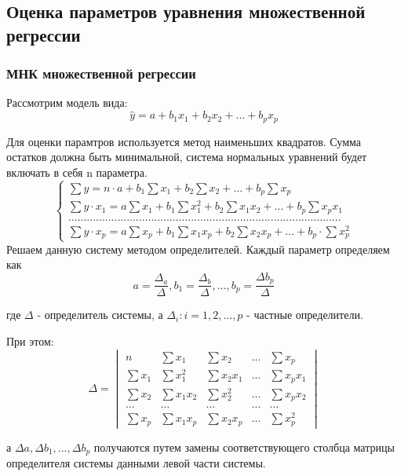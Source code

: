 \documentclass[aps,%
12pt,%
final,%
oneside,
onecolumn,%
musixtex, %
superscriptaddress,%
centertags]{article} %
\theoremstyle{plain}
\theoremstyle{definition}
\theoremstyle{remark}
\begin{document}
\newpage
\subsection{Оценка параметров уравнения множественной регрессии}

\subsubsection{МНК множественной регрессии}

Рассмотрим модель вида:
$$ \widehat{y} = a +b_1x_1 + b_2x_2 + \ldots + b_px_p$$

Для оценки парамтров используется метод наименьших квадратов. Сумма остатков должна быть минимальной, система нормальных уравнений будет включать в себя n параметра. 
$$\left \{
\begin{matrix}
	\sum y = n \cdot a + b_1 \sum x_1 + b_2 \sum x_2 + \ldots + b_p \sum x_p \\[0.3cm]
	\sum y \cdot x_1 = a \sum x_1 + b_1 \sum x_1^2 + b_2 \sum x_1x_2 + \ldots + b_p \sum x_p x_1 \\[0.3cm]
	......................................................................................... \\[0.3cm]
	\sum y \cdot x_p = a\sum x_p + b_1 \sum x_1x_p + b_2 \sum x_2x_p + \ldots + b_p \cdot \sum x_p^2
\end{matrix}
\right.
$$
Решаем данную систему методом определителей. Каждый параметр определяем как
$$ a =\frac{\Delta_a}{\Delta}, b_1 =\frac{\Delta_b}{\Delta}, \ldots , b_p = \frac{\Delta b_p}{\Delta} $$

где $\Delta$ - определитель системы, а $\Delta_i:  i ={1,2,...,p}$ - частные определители.

При этом:
$$\Delta = 
\begin{vmatrix}
n & \sum x_1 & \sum x_2 & \ldots & \sum x_p \\[0.3cm]
\sum x_1 & \sum x_1^2 & \sum x_2x_1 & \ldots & \sum x_px_1 \\[0.3cm]
\sum x_2 & \sum x_1x_2& \sum x_2^2 & \ldots & \sum x_p x_2 \\[0.3cm]
\ldots & \ldots & \ldots & \ldots & \ldots \\[0.3cm]
\sum x_p & \sum x_1x_p & \sum x_2x_p & \ldots & \sum x_p^2
\end{vmatrix}$$

а $\Delta a, \Delta b_1, \ldots , \Delta b_p$ получаются путем замены соответствующего столбца матрицы определителя системы данными левой части системы.
\end{document}
